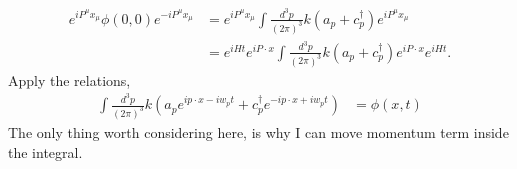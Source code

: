 \documentclass[working, oneside]{../../Preambles/tuftebook}
\begin{document}
\begin{solution}
\begin{align*}
e^{i P^\mu x_\mu} \phi(0,0) e^{-i P^\mu x_\mu} &= e^{i P^\mu x_\mu} \int \frac{d^3p}{(2\pi)^3} k (a_p + c_p^\dagger) e^{i P^\mu x_\mu} \\
&= e^{i H t} e^{i P \cdot x} \int \frac{d^3p}{(2\pi)^3} k (a_p + c_p^\dagger) e^{i P \cdot x} e^{i H t}.
\end{align*}
Apply the relations,
\begin{align*}
\int \frac{d^3p}{(2\pi)^3} k (a_p e^{i p \cdot x - i w_p t} + c_p^\dagger e^{-i p \cdot x + i w_p t}) &= \phi(x,t)
\end{align*}
The only thing worth considering here, is why I can move momentum term inside the integral.
\end{solution}
\end{document}
